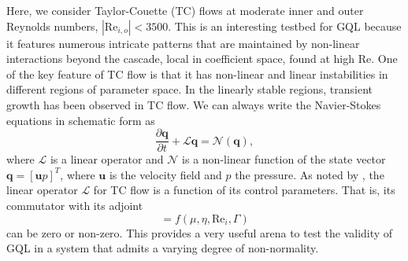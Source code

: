 \documentclass[openacc]{rstransa}%
\newcommand{\Reyn}{\mathrm{Re}}
\newcommand{\Lop}{\mathcal{L}}
\begin{document}
Here, we consider Taylor-Couette (TC) flows at moderate inner and outer Reynolds numbers, $|\Reyn_{i,o}| < 3500$. This is an interesting testbed for GQL because it features numerous intricate patterns that are maintained by non-linear interactions beyond the cascade, local in coefficient space, found at high $\Reyn$. 
One of the key feature of TC flow is that it has non-linear and linear instabilities in different regions of parameter space. In the linearly stable regions, transient growth has been observed in TC flow\cite{2002PhFl...14.3475H, 2002PhFl...14.1655M}. 
We can always write the Navier-Stokes equations in schematic form as
\begin{equation}
    \label{eqn:NS-schematic}
    \frac{\partial \mathbf{q}}{\partial t} + \Lop \mathbf{q} = \mathcal{N}(\mathbf{q}),
\end{equation}
where $\Lop$ is a linear operator and $\mathcal{N}$ is a non-linear function of the state vector $\mathbf{q} = \left[ \mathbf{u}  p\right]^T$, where $\mathbf{u}$ is the velocity field and $p$ the pressure.
As noted by \cite{2002PhFl...14.3475H}, the linear operator $\Lop$ for TC flow is a function of its control parameters.
That is, its commutator with its adjoint
\begin{equation}
    [\Lop^\dagger, \Lop] = f(\mu, \eta, \Reyn_i, \Gamma)
\end{equation}
can be zero or non-zero. 
This provides a very useful arena to test the validity of GQL in a system that admits a varying degree of non-normality.
\end{document}
